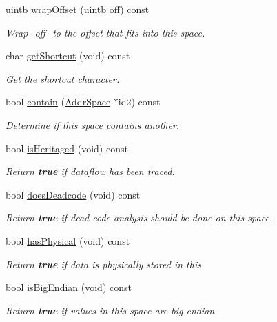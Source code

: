 \begin{DoxyCompactItemize}
\mbox{\hyperlink{types_8h_a2db313c5d32a12b01d26ac9b3bca178f}{uintb}} \mbox{\hyperlink{class_addr_space_aaf923ed847e9804b55ffa12a51202712}{wrap\+Offset}} (\mbox{\hyperlink{types_8h_a2db313c5d32a12b01d26ac9b3bca178f}{uintb}} off) const
\begin{DoxyCompactList}\small\item\em Wrap -\/off-\/ to the offset that fits into this space. \end{DoxyCompactList}\item 
char \mbox{\hyperlink{class_addr_space_aca9d79017012183ca27a1c921444c11c}{get\+Shortcut}} (void) const
\begin{DoxyCompactList}\small\item\em Get the shortcut character. \end{DoxyCompactList}\item 
bool \mbox{\hyperlink{class_addr_space_a029e10332bf92db61ae25a456c994dd6}{contain}} (\mbox{\hyperlink{class_addr_space}{Addr\+Space}} $\ast$id2) const
\begin{DoxyCompactList}\small\item\em Determine if this space contains another. \end{DoxyCompactList}\item 
bool \mbox{\hyperlink{class_addr_space_a807313f845cda34701898ec89bad58cb}{is\+Heritaged}} (void) const
\begin{DoxyCompactList}\small\item\em Return {\bfseries{true}} if dataflow has been traced. \end{DoxyCompactList}\item 
bool \mbox{\hyperlink{class_addr_space_ad21df4bc27001b5bb1f98fdff8e3decc}{does\+Deadcode}} (void) const
\begin{DoxyCompactList}\small\item\em Return {\bfseries{true}} if dead code analysis should be done on this space. \end{DoxyCompactList}\item 
bool \mbox{\hyperlink{class_addr_space_a1e506360f315658ac46593d12c20a4e0}{has\+Physical}} (void) const
\begin{DoxyCompactList}\small\item\em Return {\bfseries{true}} if data is physically stored in this. \end{DoxyCompactList}\item 
bool \mbox{\hyperlink{class_addr_space_af5683c0d7e42edec80b97bcb9fb3dc11}{is\+Big\+Endian}} (void) const
\begin{DoxyCompactList}\small\item\em Return {\bfseries{true}} if values in this space are big endian. \end{DoxyCompactList}\item 

\end{DoxyCompactItemize}
